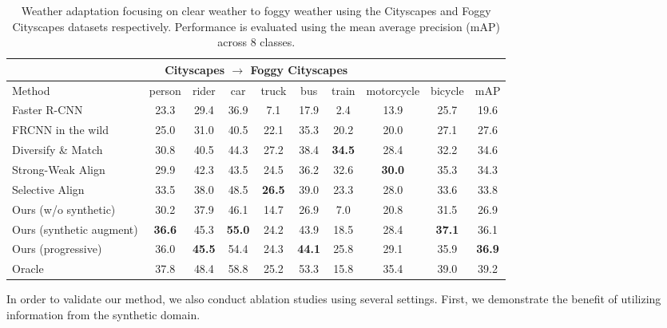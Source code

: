 \documentclass[10pt,twocolumn,letterpaper]{article}
\begin{document}
\begingroup
\renewcommand{\arraystretch}{1}
\begin{table*}[t]
\begin{center}
\caption{
Weather adaptation focusing on clear weather to foggy weather using the Cityscapes and Foggy Cityscapes datasets respectively.
Performance is evaluated using the mean average precision (mAP) across 8 classes.
}
\vspace{1mm}
\label{tab:C_F}
\begin{tabular}{lccccccccc}
                \toprule
                                         \multicolumn{10}{c}{Cityscapes $\rightarrow$ Foggy Cityscapes} \\
                \midrule
                Method & person & rider & car & truck & bus & train & motorcycle & bicycle & mAP \\
                \midrule
                Faster R-CNN  &23.3& 29.4& 36.9& 7.1& 17.9& 2.4& 13.9& 25.7& 19.6 \\
                \midrule
                FRCNN in the wild \cite{chen2018domain} & 25.0& 31.0& 40.5& 22.1& 35.3& 20.2& 20.0& 27.1& 27.6 \\
                Diversify \& Match \cite{kim2019diversify} & 30.8&40.5 & 44.3& 27.2& 38.4& \textbf{34.5}& 28.4& 32.2& 34.6\\
                Strong-Weak Align \cite{Saito_2019_CVPR} & 29.9& 42.3& 43.5& 24.5& 36.2& 32.6& \textbf{30.0}& 35.3& 34.3\\
                Selective Align \cite{Zhu_2019_CVPR} & 33.5& 38.0& 48.5& \textbf{26.5}& 39.0& 23.3& 28.0& 33.6& 33.8\\
                Ours (w/o synthetic)    & 30.2& 37.9& 46.1& 14.7& 26.9& 7.0& 20.8& 31.5& 26.9\\
                Ours (synthetic augment)   & \textbf{36.6}& 45.3& \textbf{55.0}& 24.2& 43.9& 18.5& 28.4& \textbf{37.1}& 36.1\\
Ours (progressive) & 36.0& \textbf{45.5}& 54.4& 24.3 & \textbf{44.1}& 25.8& 29.1& 35.9& \textbf{36.9}   \\        
			   \midrule
			   Oracle & 37.8& 48.4& 58.8& 25.2& 53.3& 15.8& 35.4& 39.0& 39.2\\
			   \bottomrule
\end{tabular}
\end{center}
\vspace{-7.5mm}
\end{table*}
\endgroup
In order to validate our method, we also conduct ablation studies using several settings.
First, we demonstrate the benefit of utilizing information from the synthetic domain.
\end{document}
